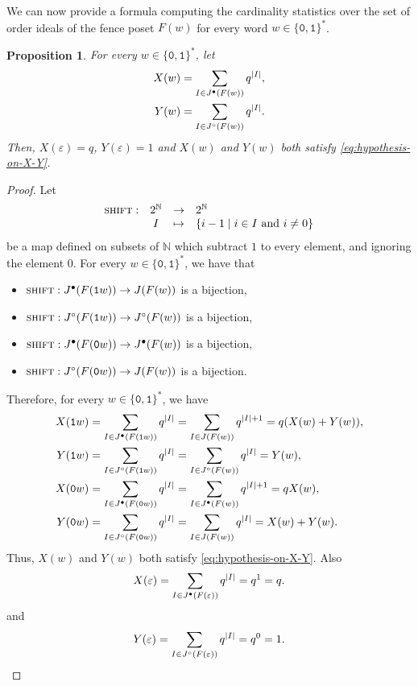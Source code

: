 \documentclass[a4paper,12pt]{amsart}
\newtheorem{proposition}[definition]{Proposition}
\newcommand{\N}{\mathbb{N}}
\newcommand{\0}{\mathtt{0}}
\newcommand{\1}{\mathtt{1}}
\newcommand{\2}{\mathtt{2}}
\newcommand{\3}{\mathtt{3}}
\DeclareMathOperator{\shift}{\textsc{shift}}
\newcommand{\size}[1]{
    {|#1|}                 %
}
\begin{document}
We can now provide a formula computing the cardinality statistics over the set of
order ideals of the fence poset $F(w)$ for every word $w\in\{\0,\1\}^*$.

\begin{proposition}\label{prop:statistics-size-satisfies-XYhypothesis}
    For every $w\in\{\0,\1\}^*$,
    let
    \begin{align*}
        X(w) &= \sum_{I\in J^\bullet(F(w))} q^{\size{I}},\\
        Y(w) &= \sum_{I\in J^\circ(F(w))} q^{\size{I}}.
    \end{align*}
    Then, $X(\varepsilon)=q$, $Y(\varepsilon)=1$ and
    $X(w)$ and $Y(w)$ both satisfy \eqref{eq:hypothesis-on-X-Y}.
\end{proposition}

\begin{proof}
    Let
    \[
        \begin{array}{rccl}
            \shift:&2^\N&\to&2^\N \\
            &I&\mapsto &\{i-1\mid i\in I\text{ and } i\neq 0\}
        \end{array}
    \]
    be a map defined on subsets of $\N$ which subtract $1$ to every element,
    and ignoring the element 0.
    For every $w\in\{\0,\1\}^*$, we have that
    \begin{itemize}
        \item $\shift:J^\bullet(F(\1w))\to J(F(w))$ is a bijection,
        \item $\shift:J^\circ(F(\1w))\to J^\circ(F(w))$ is a bijection,
        \item $\shift:J^\bullet(F(\0w))\to J^\bullet(F(w))$ is a bijection,
        \item $\shift:J^\circ(F(\0w))\to J(F(w))$ is a bijection.
    \end{itemize}
    Therefore, for every $w\in\{\0,\1\}^*$, we have
    \begin{align*}
        X(\1w)
        &= \sum_{I\in J^\bullet(F(\1w))} q^{\size{I}}
        = \sum_{I\in J(F(w))} q^{\size{I}+1}
        = q (X(w)+Y(w)),\\
        Y(\1w)
        &= \sum_{I\in J^\circ(F(\1w))} q^{\size{I}}
        = \sum_{I\in J^\circ(F(w))} q^{\size{I}}
        = Y(w),\\
        X(\0w)
        &= \sum_{I\in J^\bullet(F(\0w))} q^{\size{I}}
        = \sum_{I\in J^\bullet(F(w))} q^{\size{I}+1}
        = q X(w),\\
        Y(\0w)
        &= \sum_{I\in J^\circ(F(\0w))} q^{\size{I}}
        = \sum_{I\in J(F(w))} q^{\size{I}}
        = X(w)+Y(w).
    \end{align*}
    Thus, $X(w)$ and $Y(w)$ both satisfy \eqref{eq:hypothesis-on-X-Y}.
    Also
    \[
        X(\varepsilon)
        = \sum_{I\in J^\bullet(F(\varepsilon))} q^{\size{I}}
        = q^1 = q.
    \]
    and
    \[
        Y(\varepsilon)
        = \sum_{I\in J^\circ(F(\varepsilon))} q^{\size{I}}
        = q^0 = 1. 
    \]
\end{proof}
\end{document}
